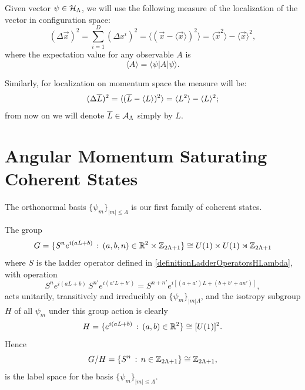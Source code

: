Given vector $\psi \in \mathcal H_\Lambda$, we will use the following measure of the localization of the vector in configuration space:
\begin{equation}
    (\Delta \vec x)^2 = \sum_{i = 1}^D (\Delta x^i)^2 = \langle (\vec x - \langle \vec x \rangle)^2 \rangle = \langle \vec x^2 \rangle - \langle \vec x \rangle ^2,
\end{equation}
where the expectation value for any observable $A$ is
\begin{equation}
    \langle A \rangle = \langle \psi | A | \psi \rangle.
\end{equation}

Similarly, for localization on momentum space the measure will be:
\begin{equation}
    (\Delta \overline{L})^2 = \langle (\overline{L} - \langle L \rangle )^2 \rangle = \langle L^2 \rangle - \langle L \rangle ^2;
\end{equation}
from now on we will denote $\overline{L} \in \mathcal A_{\Lambda}$ simply by $L$.

\section{Angular Momentum Saturating Coherent States}

The orthonormal basis $\{\psi_m\}_{|m| \leq \Lambda}$ is our first family of coherent states. 

The group 
\begin{equation}
    G = \{S^n e^{i(aL + b)} \,:\, (a, b, n) \in \mathbb{R}^2 \times \mathbb{Z}_{2\Lambda + 1}\} \cong U(1) \times U(1) \rtimes \mathbb{Z}_{2\Lambda + 1}
\end{equation}
where $S$ is the ladder operator defined in \ref{definitionLadderOperatorsHLambda}, with operation
\begin{equation*}
    S^n e^{i(aL+b)}\, S^{n'}e^{i(a'L+b')} = S^{n + n'} e^{i[(a+a')L + (b + b' + an')]},
\end{equation*}
acts unitarily, transitively and irreducibly on $\{\psi_m\}_{|m|\Lambda}$, and the isotropy subgroup $H$ of all $\psi_m$ under this group action is clearly
\begin{equation}
    H = \{e^{i(aL+b)} \,:\, (a, b) \in \mathbb{R}^2 \} \cong [U(1)]^2.
\end{equation}
Hence 
\begin{equation}
    G/H = \{S^n \,:\, n \in \mathbb{Z}_{2\Lambda + 1}\} \cong \mathbb{Z}_{2\Lambda + 1},
\end{equation}
is the label space for the basis $\{\psi_m\}_{|m|\leq \Lambda}$. 

